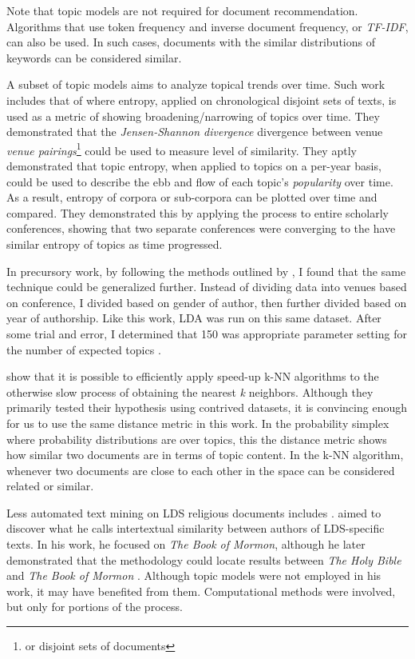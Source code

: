 Note that topic models are not required for document recommendation. Algorithms that use token frequency and inverse document frequency, or \emph{TF-IDF}, can also be used. In such cases, documents with the similar distributions of keywords can be considered similar.

A subset of topic models aims to analyze topical trends over time. Such work includes that of \cite{hall-jurafsky-manning:2008:EMNLP} where entropy, applied on chronological disjoint sets of texts, is used as a metric of showing broadening/narrowing of topics over time. They demonstrated that the \emph{Jensen-Shannon divergence} divergence between venue \emph{venue pairings}\footnote{or disjoint sets of documents} could be used to measure level of similarity. They aptly demonstrated that topic entropy, when applied to topics on a per-year basis, could be used to describe the ebb and flow of each topic’s \emph{popularity} over time. As a result, entropy of corpora or sub-corpora can be plotted over time and compared. They demonstrated this by applying the process to entire scholarly conferences, showing that two separate conferences were converging to the have similar entropy of topics as time progressed.

In precursory work, by following the methods outlined by \cite{hall-jurafsky-manning:2008:EMNLP}, I found that the same technique could be generalized further. Instead of dividing data into venues based on conference, I divided based on gender of author, then further divided based on year of authorship. Like this work, LDA was run on this same dataset. After some trial and error, I determined that 150 was appropriate parameter setting for the number of expected topics \citep{bean5-LDA-ToT}.

\cite{Krstovski2013efficient} %
show that it is possible to efficiently apply speed-up k-NN algorithms to the otherwise slow process of obtaining the nearest \emph{k} neighbors. Although they primarily tested their hypothesis using contrived datasets, it is convincing enough for us to use the same distance metric in this work. In the probability simplex where probability distributions are over topics, this the distance metric shows how similar two documents are in terms of topic content. In the k-NN algorithm, whenever two documents are close to each other in the space can be considered related or similar.

Less automated text mining on LDS religious documents includes \citep{hilton:2008:abinadi} %
. \citeauthor{hilton:2008:abinadi} aimed to discover what he calls intertextual similarity between authors of LDS-specific texts. In his work, he focused on \emph{The Book of Mormon}, although he later demonstrated that the methodology could locate results between \emph{The Holy Bible} and \emph{The Book of Mormon} \citep{hilton:2013:psalms}. Although topic models were not employed in his work, it may have benefited from them. Computational methods were involved, but only for portions of the process.

